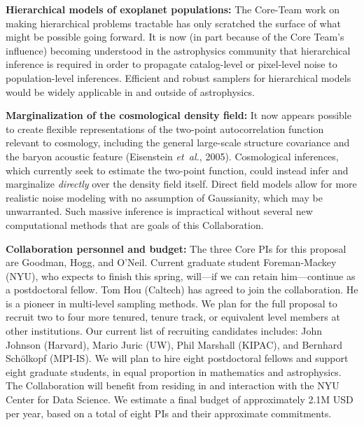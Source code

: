 \documentclass[11pt]{article}
\newcommand{\foreign}[1]{\textsl{#1}}
\newcommand{\etal}{\foreign{et~al.}}
\renewcommand{\paragraph}[1]{\smallskip\par\noindent\textbf{{#1}:}}
\begin{document}
\textbf{Hierarchical models of exoplanet populations:}
The Core-Team work on making hierarchical problems tractable has
only scratched the surface of what might be possible going forward.
It is now (in part because of the Core Team's influence) becoming
understood in the astrophysics community that hierarchical inference
is required in order to propagate catalog-level or pixel-level noise to
population-level inferences.
Efficient and robust samplers for hierarchical models would be widely 
applicable in
and outside of astrophysics.

\textbf{Marginalization of the cosmological density field:} 
It now appears possible to create flexible representations of the
two-point autocorrelation function relevant to cosmology, including
the general large-scale structure covariance and the baryon
acoustic feature (Eisenstein \etal, 2005).
Cosmological inferences, which currently seek to estimate the two-point 
function, could instead infer and marginalize {\em directly}
over the density field itself.
Direct field models allow for more realistic noise modeling with no
assumption of Gaussianity, which may be unwarranted.
Such massive inference is impractical without several new computational
methods
that are goals of this Collaboration.

\paragraph{Collaboration personnel and budget}
The three Core PIs for this proposal are Goodman, Hogg, and O'Neil.
Current graduate student Foreman-Mackey (NYU), who expects to finish
this spring, will---if we can retain him---continue as a postdoctoral
fellow.
Tom Hou (Caltech) has agreed to join the collaboration.
He is a pioneer in multi-level sampling methods.
We plan for the full proposal to recruit two to four more tenured,
tenure track, or equivalent level members at other institutions.  Our
current list of recruiting candidates includes: John
Johnson (Harvard), Mario Juric (UW), Phil Marshall (KIPAC), and Bernhard
Sch\"olkopf (MPI-IS).
We will plan to hire eight postdoctoral fellows and support eight
graduate students, in equal proportion in mathematics and astrophysics.
The Collaboration will benefit from residing in and interaction with the NYU Center for Data Science.
We estimate a final budget of approximately 2.1M USD per year,
based on a total of eight PIs and their approximate commitments.
\end{document}
